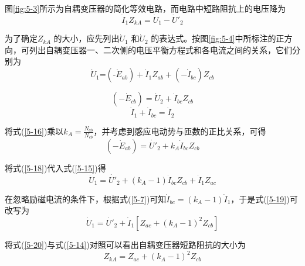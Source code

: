 \documentclass{book}
\begin{document}
图\ref{fig:5-3}所示为自耦变压器的简化等效电路，而电路中短路阻抗上的电压降为
\begin{equation}
{{\dot{I}}_{1}}{{Z}_{kA}}={{\dot{U}}_{1}}-{{{\dot{U}}'}_{2}}
\label{5-14}
\end{equation}

为了确定${{Z}_{kA}}$ 的大小，应先列出${{\dot{U}}_{1}}$ 和${{\dot{U}}_{2}}$ 的表达式。按图\ref{fig:5-4}中所标注的正方向，可列出自耦变压器一、二次侧的电压平衡方程式和各电流之间的关系，它们分别为
\begin{equation}
{{\dot{U}}_{1}}\text{=}\left( \text{-}{{{\dot{E}}}_{ab}} \right)+{{\dot{I}}_{1}}{{Z}_{ab}}+\left( -{{{\dot{I}}}_{bc}} \right){{Z}_{cb}}
\label{5-15}
\end{equation}

\begin{equation}
\left( -{{{\dot{E}}}_{cb}} \right)={{\dot{U}}_{2}}+{{\dot{I}}_{bc}}{{Z}_{cb}}
\label{5-16}
\end{equation}
\begin{equation}
{{\dot{I}}_{1}}+{{\dot{I}}_{bc}}={{\dot{I}}_{2}}
\label{5-17}
\end{equation}

将式(\ref{5-16})乘以${{k}_{A}}=\frac{{{N}_{ab}}}{{{N}_{cb}}}$，并考虑到感应电动势与匝数的正比关系，可得
\begin{equation}
\left( -{{{\dot{E}}}_{ab}} \right)={{\dot{{U}'}}_{2}}+{{k}_{A}}{{\dot{I}}_{bc}}{{Z}_{cb}}
\label{5-18}
\end{equation}

将式(\ref{5-18})代入式(\ref{5-15})得
\begin{equation}
{{\dot{U}}_{1}}={{\dot{{U}'}}_{2}}+\left( {{k}_{A}}-1 \right){{\dot{I}}_{bc}}{{Z}_{cb}}+{{\dot{I}}_{1}}{{Z}_{ac}}
\label{5-19}
\end{equation}

在忽略励磁电流的条件下，根据式(\ref{5-7})可知${{\dot{I}}_{bc}}=\left( {{k}_{A}}-1 \right){{\dot{I}}_{1}}$，于是式(\ref{5-19})可改写为
\begin{equation}
{{\dot{U}}_{1}}={{\dot{{U}'}}_{2}}+{{\dot{I}}_{1}}\left[ {{Z}_{ac}}+{{\left( {{k}_{A}}-1 \right)}^{2}}{{Z}_{cb}} \right]
\label{5-20}
\end{equation}

将式(\ref{5-20})与式(\ref{5-14})对照可以看出自耦变压器短路阻抗的大小为
\begin{equation}
{{Z}_{kA}}={{Z}_{ac}}+{{\left( {{k}_{A}}-1 \right)}^{2}}{{Z}_{cb}}
\label{5-21}
\end{equation}
\end{document}
